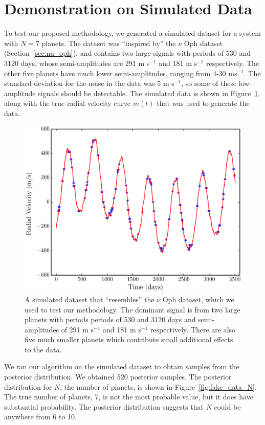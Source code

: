 \documentclass[useAMS,usenatbib]{mn2e}
\begin{document}
\section{Demonstration on Simulated Data}\label{sec:fake_data}
To test our proposed methodology, we generated a simulated dataset for a
system with $N=7$ planets. The dataset was ``inspired by'' the $\nu$ Oph
dataset (Section~\ref{sec:nu_oph}), and contains two large signals with
periods of 530 and 3120 days, whose semi-amplitudes are
291 m s$^{-1}$ and 181 m s$^{-1}$ respectively. The other five planets have
much lower semi-amplitudes, ranging from 4-30 ms$^{-1}$. The standard deviation
for the noise in the data was 5 m s$^{-1}$, so some of these low-amplitude
signals should be detectable. The simulated data is shown in
Figure~\ref{fig:fake_data}, along with the true radial velocity curve $m(t)$
that was used to generate the data.

\begin{figure}
\includegraphics[scale=0.4]{Figures/fake_data.eps}
\caption{A simulated dataset that ``resembles'' the $\nu$ Oph dataset, which
we used to test our methodology. The dominant signal is from two large
planets with periods periods of 530 and 3120 days and semi-amplitudes of
291 m s$^{-1}$ and 181 m s$^{-1}$ respectively. There are also five
much smaller planets which contribute small additional effects to the data.
\label{fig:fake_data}}
\end{figure}

We ran our algorithm on the simulated dataset to obtain samples from the
posterior distribution. We obtained 520 posterior samples.
The posterior distribution for $N$, the number of
planets, is shown in Figure~\ref{fig:fake_data_N}. The true number of planets,
7, is not the most probable value, but it does have substantial probability.
The posterior distribution suggests that $N$ could be anywhere from 6 to 10.
\end{document}
